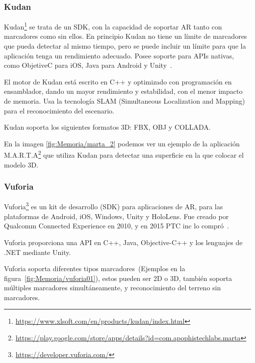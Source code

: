\subsubsection{Kudan} 

Kudan\footnote{\url{https://www.xlsoft.com/en/products/kudan/index.html}} 
se trata de un SDK, con la capacidad de soportar AR tanto con marcadores como sin ellos. En principio Kudan no tiene un límite de marcadores que pueda detectar al mismo tiempo, pero se puede incluir un límite para que la aplicación tenga un rendimiento adecuado. 
Posee soporte para APIs nativas, como ObjetiveC para iOS, Java para Android y Unity~\cite{kudan_developer_hub}.

El motor de Kudan está escrito en C++ y optimizado con programación en ensamblador, dando un mayor rendimiento y estabilidad, con el menor impacto de memoria.
Usa la tecnología SLAM (Simultaneous Localization and Mapping) para el reconocimiento del escenario.

Kudan soporta los siguientes formatos 3D: FBX, OBJ y COLLADA.

En la imagen \ref{fig:Memoria/marta_2} podemos ver un ejemplo de la aplicación M.A.R.T.A\footnote{\url{https://play.google.com/store/apps/details?id=com.apophistechlabs.marta}} que utiliza Kudan para detectar una superficie en la que colocar el modelo 3D.




\subsubsection{Vuforia}\label{sub:Def_Vuforia}

Vuforia\footnote{\url{https://developer.vuforia.com/}} es un kit de desarrollo (SDK) para aplicaciones de AR, para las plataformas de Android, iOS, Windows, Unity y HoloLens. Fue creado por Qualcomm Connected Experience en 2010, y en 2015 PTC inc lo compró~\cite{simonetti2013vuforia}.

Vuforia proporciona una API en C++, Java, Objective-C++ y los lenguajes de .NET mediante Unity.

Vuforia soporta diferentes tipos marcadores~(Ejemplos en la figura~\ref{fig:Memoria/vuforia01}), estos pueden ser 2D o 3D, también soporta múltiples marcadores simultáneamente, y reconocimiento del terreno sin marcadores.


